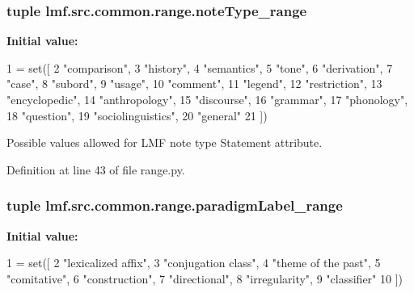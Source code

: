 \hypertarget{namespacelmf_1_1src_1_1common_1_1range_a042b6a6bbc9e29deed31854fb1767b88}{
\subsubsection[{note\+Type\+\_\+range}]{\setlength{\rightskip}{0pt plus 5cm}tuple lmf.\+src.\+common.\+range.\+note\+Type\+\_\+range}}\label{namespacelmf_1_1src_1_1common_1_1range_a042b6a6bbc9e29deed31854fb1767b88}
{\bfseries Initial value\+:}
\begin{DoxyCode}
1 = set([
2     \textcolor{stringliteral}{"comparison"},
3     \textcolor{stringliteral}{"history"},
4     \textcolor{stringliteral}{"semantics"},
5     \textcolor{stringliteral}{"tone"},
6     \textcolor{stringliteral}{"derivation"},
7     \textcolor{stringliteral}{"case"},
8     \textcolor{stringliteral}{"subord"},
9     \textcolor{stringliteral}{"usage"},
10     \textcolor{stringliteral}{"comment"},
11     \textcolor{stringliteral}{"legend"},
12     \textcolor{stringliteral}{"restriction"},
13     \textcolor{stringliteral}{"encyclopedic"},
14     \textcolor{stringliteral}{"anthropology"},
15     \textcolor{stringliteral}{"discourse"},
16     \textcolor{stringliteral}{"grammar"},
17     \textcolor{stringliteral}{"phonology"},
18     \textcolor{stringliteral}{"question"},
19     \textcolor{stringliteral}{"sociolinguistics"},
20     \textcolor{stringliteral}{"general"}
21 ])
\end{DoxyCode}


Possible values allowed for L\+M\+F note type Statement attribute. 



Definition at line 43 of file range.\+py.

\hypertarget{namespacelmf_1_1src_1_1common_1_1range_a9915518fc99ee54c5ac61a23dc12aefe}{
\subsubsection[{paradigm\+Label\+\_\+range}]{\setlength{\rightskip}{0pt plus 5cm}tuple lmf.\+src.\+common.\+range.\+paradigm\+Label\+\_\+range}}\label{namespacelmf_1_1src_1_1common_1_1range_a9915518fc99ee54c5ac61a23dc12aefe}
{\bfseries Initial value\+:}
\begin{DoxyCode}
1 = set([
2     \textcolor{stringliteral}{"lexicalized affix"},
3     \textcolor{stringliteral}{"conjugation class"},
4     \textcolor{stringliteral}{"theme of the past"},
5     \textcolor{stringliteral}{"comitative"},
6     \textcolor{stringliteral}{"construction"},
7     \textcolor{stringliteral}{"directional"},
8     \textcolor{stringliteral}{"irregularity"},
9     \textcolor{stringliteral}{"classifier"}
10 ])
\end{DoxyCode}


